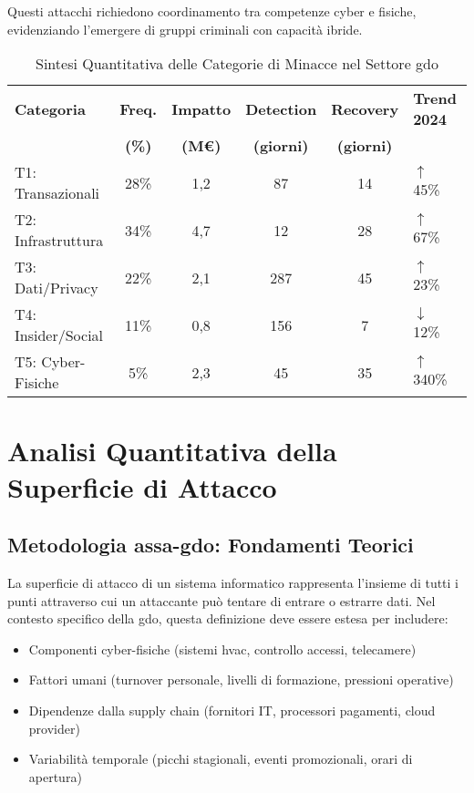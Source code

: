 Questi attacchi richiedono coordinamento tra competenze cyber e fisiche, evidenziando l'emergere di gruppi criminali con capacità ibride.

\begin{table}[htbp]
\centering
\caption{Sintesi Quantitativa delle Categorie di Minacce nel Settore \gls{gdo}}
\label{tab:threat_categories_summary}
\small
\begin{tabular}{p{3cm}ccccl}
\toprule
\textbf{Categoria} & \textbf{Freq.} & \textbf{Impatto} & \textbf{Detection} & \textbf{Recovery} & \textbf{Trend 2024} \\
 & \textbf{(\%)} & \textbf{(M€)} & \textbf{(giorni)} & \textbf{(giorni)} & \\
\midrule
T1: Transazionali & 28\% & 1,2 & 87 & 14 & $\uparrow$ 45\% \\
T2: Infrastruttura & 34\% & 4,7 & 12 & 28 & $\uparrow$ 67\% \\
T3: Dati/Privacy & 22\% & 2,1 & 287 & 45 & $\uparrow$ 23\% \\
T4: Insider/Social & 11\% & 0,8 & 156 & 7 & $\downarrow$ 12\% \\
T5: Cyber-Fisiche & 5\% & 2,3 & 45 & 35 & $\uparrow$ 340\% \\
\bottomrule
\end{tabular}
\end{table}

\section{\texorpdfstring{Analisi Quantitativa della Superficie di Attacco}{2.3 - Analisi Quantitativa della Superficie di Attacco}}
\label{sec:2.3_superficie_attacco}

\subsection{\texorpdfstring{Metodologia \gls{assa-gdo}: Fondamenti Teorici}{2.3.1 - Metodologia ASSA-GDO: Fondamenti Teorici}}
\label{subsec:2.3.1_metodologia}

La superficie di attacco di un sistema informatico rappresenta l'insieme di tutti i punti attraverso cui un attaccante può tentare di entrare o estrarre dati. Nel contesto specifico della \gls{gdo}, questa definizione deve essere estesa per includere:

\begin{itemize}
\item Componenti cyber-fisiche (sistemi \gls{hvac}, controllo accessi, telecamere)
\item Fattori umani (turnover personale, livelli di formazione, pressioni operative)
\item Dipendenze dalla supply chain (fornitori IT, processori pagamenti, cloud provider)
\item Variabilità temporale (picchi stagionali, eventi promozionali, orari di apertura)
\end{itemize}

